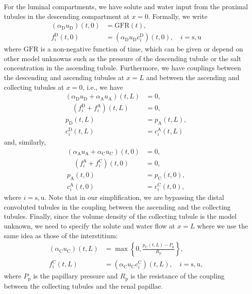 \documentclass{article}
\begin{document}
For the luminal compartments, we have solute and water input from the proximal tubules in the descending compartment at $x=0$.
Formally, we write
\begin{align}
    (\alpha_\mathrm{D} u_\mathrm{D})(t,0) &= \mathrm{GFR}(t),\\
    f_i^\mathrm{D}(t,0) &= (\alpha_\mathrm{D}u_\mathrm{D}c_i^\mathrm{D})(t,0),\quad i=\mathrm{s,u}
\end{align}
    where $\mathrm{GFR}$ is a non-negative function of time, which can be given or depend on other model unknowns such as the pressure of the descending tubule or the salt concentration in the ascending tubule.
Furthermore, we have couplings between the descending and ascending tubules at $x=L$ and between the ascending and collecting tubules at $x=0$, i.e., we have
\begin{align}
    (\alpha_\mathrm{D}u_\mathrm{D}+\alpha_\mathrm{A}u_\mathrm{A})(t,L) &= 0,\\
    \quad\left( f_i^\mathrm{D}+f_i^\mathrm{A} \right)(t,L) &= 0,\\
    p_\mathrm{D}(t,L)&= p_{\mathrm{A}}(t,L),\\ 
    c_i^\mathrm{D}(t,L) &=c_i^\mathrm{A}(t,L)
\end{align}
and, similarly,
\begin{align}
    (\alpha_\mathrm{A}u_\mathrm{A}+\alpha_\mathrm{C}u_\mathrm{C})(t,0) &= 0,\\
    \quad\left( f_i^\mathrm{A}+f_i^\mathrm{C} \right)(t,0) &= 0,\\
    p_\mathrm{A}(t,0)&= p_{\mathrm{C}}(t,0),\\ 
    c_i^\mathrm{A}(t,0) &=c_i^\mathrm{C}(t,0),
\end{align}
    where $i = \mathrm{s},\mathrm{u}$.
Note that in our simplification, we are bypassing the distal convoluted tubules in the coupling between the ascending and the collecting tubules.
Finally, since the volume density of the collecting tubule is the model unknown, we need to specify the solute and water flow at $x=L$ where we use the same idea as those of the interstitium:
\begin{align}
    (\alpha_\mathrm{C} u_\mathrm{C} )(t,L) &= \max\left\{ 0,\frac{p_\mathrm{C} (t,L) - P_{\mathrm{p}} }{R_{\mathrm{p}}}\right\},\\
    f_i^\mathrm{C}(t,L) &= (\alpha_\mathrm{C}  u_\mathrm{C}  c_i^\mathrm{C})(t,L),\quad i=\mathrm{s},\mathrm{u},
\end{align}
    where $P_\mathrm{p}$ is the papillary pressure and $R_\mathrm{p}$ is the resistance of the coupling between the collecting tubules and the renal papillae.
\end{document}
